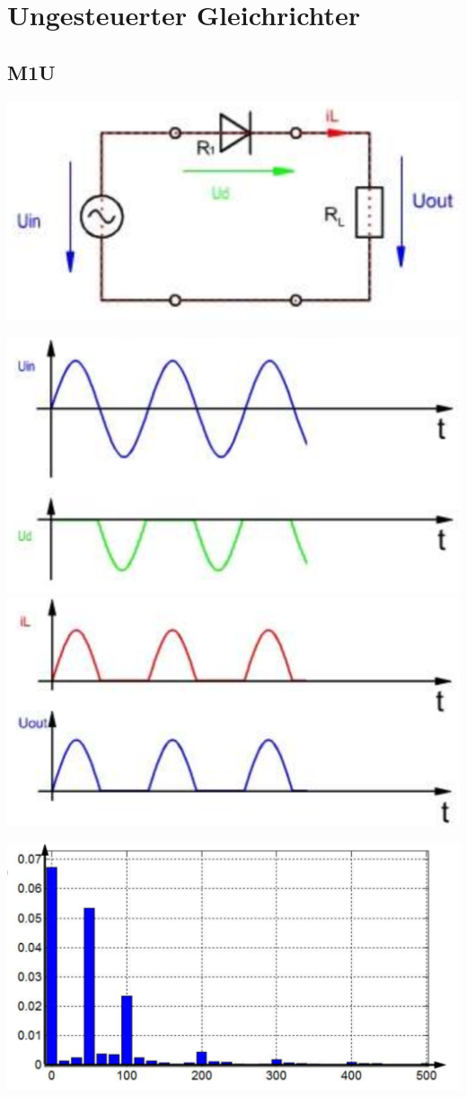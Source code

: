 \section{Ungesteuerter Gleichrichter}
\subsection{M1U}
\vspace{-0.5cm}
\begin{minipage}{0.4\linewidth}
    \includegraphics[width=\linewidth]{images/PrakUGM1}
\end{minipage}
\begin{minipage}{0.3\linewidth}
    \centering
   \includegraphics[width=0.7\linewidth]{images/PrakUGM1Kl1}
   \includegraphics[width=0.7\linewidth]{images/PrakUGM1Kl2}
\end{minipage}
\begin{minipage}{0.3\linewidth}
    \includegraphics[width=\linewidth]{images/UGM1OW} 
\end{minipage}
